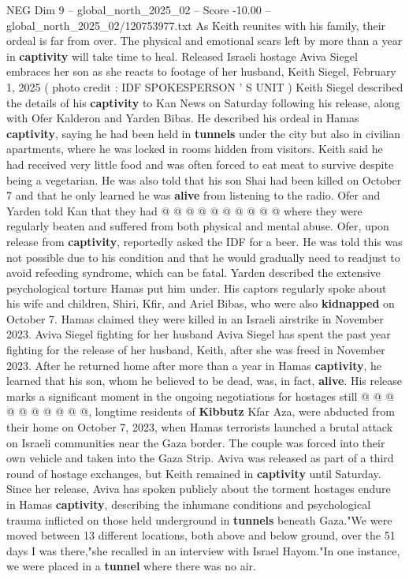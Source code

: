 \begin{textsample}{NEG Dim 9 – global\_north\_2025\_02 – Score -10.00 – global\_north\_2025\_02/120753977.txt}  \label{ex:f9_neg_053}
As Keith reunites with his family, their ordeal is far from over.
The physical and emotional scars left by more than a year in \textbf{captivity} will take time to heal.
Released Israeli hostage Aviva Siegel embraces her son as she reacts to footage of her husband, Keith Siegel, February 1, 2025 ( photo credit : IDF SPOKESPERSON ' S UNIT ) Keith Siegel described the details of his \textbf{captivity} to Kan News on Saturday following his release, along with Ofer Kalderon and Yarden Bibas.
He described his ordeal in Hamas \textbf{captivity}, saying he had been held in \textbf{tunnels} under the city but also in civilian apartments, where he was locked in rooms hidden from visitors.
Keith said he had received very little food and was often forced to eat meat to survive despite being a vegetarian.
He was also told that his son Shai had been killed on October 7 and that he only learned he was \textbf{alive} from listening to the radio.
Ofer and Yarden told Kan that they had @ @ @ @ @ @ @ @ @ @ where they were regularly beaten and suffered from both physical and mental abuse.
Ofer, upon release from \textbf{captivity}, reportedly asked the IDF for a beer.
He was told this was not possible due to his condition and that he would gradually need to readjust to avoid refeeding syndrome, which can be fatal.
Yarden described the extensive psychological torture Hamas put him under.
His captors regularly spoke about his wife and children, Shiri, Kfir, and Ariel Bibas, who were also \textbf{kidnapped} on October 7.
Hamas claimed they were killed in an Israeli airstrike in November 2023.
Aviva Siegel fighting for her husband Aviva Siegel has spent the past year fighting for the release of her husband, Keith, after she was freed in November 2023.
After he returned home after more than a year in Hamas \textbf{captivity}, he learned that his son, whom he believed to be dead, was, in fact, \textbf{alive}.
His release marks a significant moment in the ongoing negotiations for hostages still @ @ @ @ @ @ @ @ @ @, longtime residents of \textbf{Kibbutz} Kfar Aza, were abducted from their home on October 7, 2023, when Hamas terrorists launched a brutal attack on Israeli communities near the Gaza border.
The couple was forced into their own vehicle and taken into the Gaza Strip.
Aviva was released as part of a third round of hostage exchanges, but Keith remained in \textbf{captivity} until Saturday.
Since her release, Aviva has spoken publicly about the torment hostages endure in Hamas \textbf{captivity}, describing the inhumane conditions and psychological trauma inflicted on those held underground in \textbf{tunnels} beneath Gaza."We were moved between 13 different locations, both above and below ground, over the 51 days I was there,"she recalled in an interview with Israel Hayom."In one instance, we were placed in a \textbf{tunnel} where there was no air.

\end{textsample}

